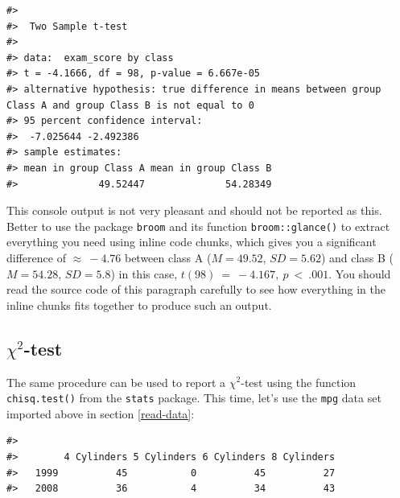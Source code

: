\documentclass[
  11pt,
  a4paper,
  twoside]{scrbook}
\newenvironment{Shaded}{\begin{snugshade}}{\end{snugshade}}
\newcommand{\CommentTok}[1]{\textcolor[rgb]{0.56,0.35,0.01}{\textit{#1}}}
\newcommand{\FunctionTok}[1]{\textcolor[rgb]{0.00,0.00,0.00}{#1}}
\newcommand{\NormalTok}[1]{#1}
\newcommand{\OtherTok}[1]{\textcolor[rgb]{0.56,0.35,0.01}{#1}}
\newcommand{\SpecialCharTok}[1]{\textcolor[rgb]{0.00,0.00,0.00}{#1}}
\begin{document}
\linespread{1}

\begin{verbatim}
#> 
#>  Two Sample t-test
#> 
#> data:  exam_score by class
#> t = -4.1666, df = 98, p-value = 6.667e-05
#> alternative hypothesis: true difference in means between group Class A and group Class B is not equal to 0
#> 95 percent confidence interval:
#>  -7.025644 -2.492386
#> sample estimates:
#> mean in group Class A mean in group Class B 
#>              49.52447              54.28349
\end{verbatim}

This console output is not very pleasant and should not be reported as this. Better to use the package \texttt{broom} and its function \texttt{broom::glance()} to extract everything you need using inline code chunks, which gives you a significant difference of \(\approx~-4.76\) between class A (\(M = 49.52\), \(SD = 5.62\)) and class B (\(M = 54.28\), \(SD = 5.8\)) in this case, \(t(98)~=~-4.167,~p~<~.001\). You should read the source code of this paragraph carefully to see how everything in the inline chunks fits together to produce such an output.

\hypertarget{chi2-test}{%
\subsection{\texorpdfstring{\(\chi^2\)-test}{\textbackslash chi\^{}2-test}}\label{chi2-test}}

The same procedure can be used to report a \(\chi^2\)-test using the function \texttt{chisq.test()} from the \texttt{stats} package. This time, let's use the \texttt{mpg} data set imported above in section \ref{read-data}:

\linespread{1}

\begin{Shaded}
\end{Shaded}

\linespread{1}

\begin{verbatim}
#>       
#>        4 Cylinders 5 Cylinders 6 Cylinders 8 Cylinders
#>   1999          45           0          45          27
#>   2008          36           4          34          43
\end{verbatim}
\end{document}

